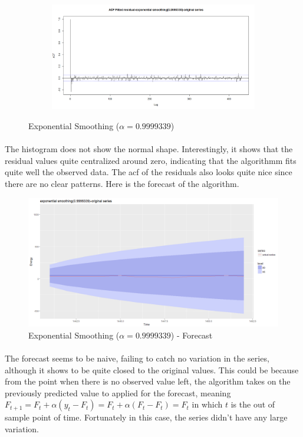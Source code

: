 \documentclass[12pt]{article}
\begin{document}
\begin{figure}[H]
\begin{subfigure}[b]{0.49\linewidth}
  \end{subfigure}
  \begin{subfigure}[b]{0.49\linewidth}
    \includegraphics[width=\linewidth]{figure19-4.png}
  \end{subfigure}
  \caption{Exponential Smoothing ($\alpha=0.9999339$)}
  \label{fig:figure19}
\end{figure}

\paragraph{}
The histogram does not show the normal shape. Interestingly, it shows that the residual values quite centralized around zero, indicating that the algorithmm fits quite well the observed data. The acf of the residuals also looks quite nice since there are no clear patterns. Here is the forecast of the algorithm.
\begin{figure}[H]
  \centering
  \includegraphics[width=\linewidth]{figure19-5.png}
  \caption{Exponential Smoothing ($\alpha=0.9999339$) - Forecast}
  \label{fig:figure20}
\end{figure}

\paragraph{}
The forecast seems to be naive, failing to catch no variation in the series, although it shows to be quite closed to the original values. This could be because from the point when there is no observed value left, the algorithm takes on the previously predicted value to applied for the forecast, meaning $F_{t+1}=F_t+\alpha(y_t-F_t)=F_t +\alpha(F_t-F_t)=F_t$ in which $t$ is the out of sample point of time. Fortunately in this case, the series didn't have any large variation.
\end{document}
